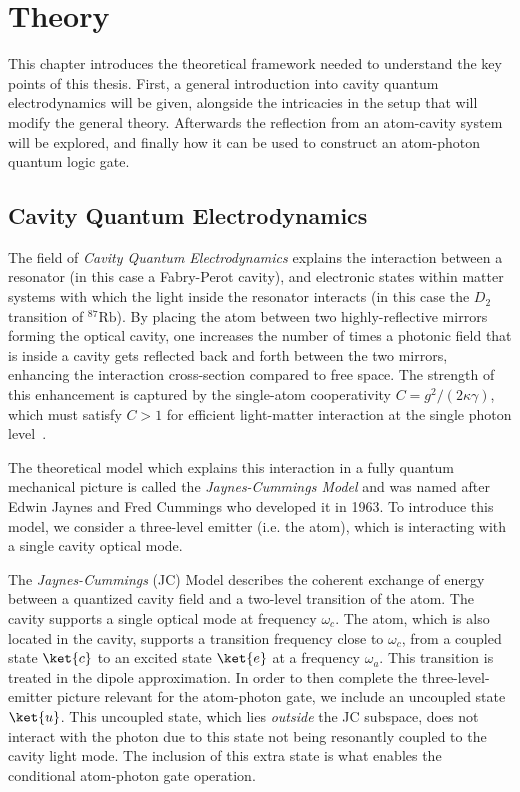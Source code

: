 \chapter{Theory}\label{chapter:theory}
This chapter introduces the theoretical framework needed to understand the key points of this thesis. First, a general introduction into cavity quantum electrodynamics will be given, alongside the intricacies in the setup that will modify the general theory. Afterwards the reflection from an atom-cavity system will be explored, and finally how it can be used to construct an atom-photon quantum logic gate.

\section{Cavity Quantum Electrodynamics}

The field of \textit{Cavity Quantum Electrodynamics} explains the interaction between a resonator (in this case a Fabry-Perot cavity), and electronic states within matter systems with which the light inside the resonator interacts (in this case the $D_2$ transition of $^{87}\text{Rb}$). By placing the atom between two highly-reflective mirrors forming the optical cavity, one increases the number of times a photonic field that is inside a cavity gets reflected back and forth between the two mirrors, enhancing the interaction cross-section compared to free space. The strength of this enhancement is captured by the single-atom cooperativity $C=g^2/(2\kappa\gamma)$, which must satisfy $C>1$ for efficient light-matter interaction at the single photon level~\cite{RempeReiserer2015}.

The theoretical model which explains this interaction in a fully quantum mechanical picture is called the \textit{Jaynes-Cummings Model} \cite{JaynesCummings1963} and was named after Edwin Jaynes and Fred Cummings who developed it in 1963. To introduce this model, we consider a three-level emitter (i.e. the atom), which is interacting with a single cavity optical mode.

The \textit{Jaynes-Cummings} (JC) Model describes the coherent exchange of energy between a quantized cavity field and a two-level transition of the atom. The cavity supports a single optical mode at frequency $\omega_c$.
The atom, which is also located in the cavity, supports a transition frequency close to $\omega_c$, from a coupled state $\ket{c}$ to an excited state $\ket{e}$ at a frequency $\omega_a$. This transition is treated in the dipole approximation.
In order to then complete the three-level-emitter picture relevant for the atom-photon gate, we include an uncoupled state $\ket{u}$. This uncoupled state, which lies \emph{outside} the JC subspace, does not interact with the photon due to this state not being resonantly coupled to the cavity light mode. The inclusion of this extra state is what enables the conditional atom-photon gate operation.

